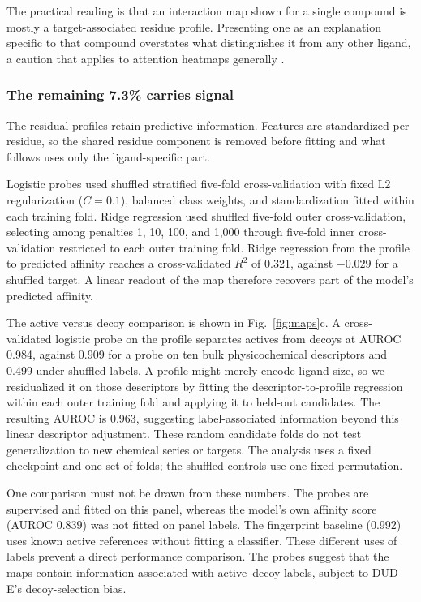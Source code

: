 \documentclass{ieeeaccess}
\begin{document}
The practical reading is that an interaction map shown for a single compound is
mostly a target-associated residue profile. Presenting one as an explanation specific to
that compound overstates what distinguishes it from any other ligand, a caution
that applies to attention heatmaps generally
\cite{jimenezluna2020xai,jain2019attention,wiegreffe2019attention}.

\subsubsection{The remaining 7.3\% carries signal}
The residual profiles retain predictive information. Features are standardized
per residue, so the shared residue component is removed before fitting and
what follows uses only the ligand-specific part.

Logistic probes used shuffled stratified five-fold cross-validation with fixed
L2 regularization ($C = 0.1$), balanced class weights, and standardization fitted
within each training fold. Ridge regression used shuffled five-fold outer
cross-validation, selecting among penalties 1, 10, 100, and 1{,}000 through
five-fold inner cross-validation restricted to each outer training fold.
Ridge regression from the profile to predicted affinity reaches a
cross-validated $R^2$ of 0.321, against $-0.029$ for a shuffled target. A linear
readout of the map therefore recovers part of the model's predicted affinity.

The active versus decoy comparison is shown in Fig.~\ref{fig:maps}c. A
cross-validated logistic probe on the profile separates actives from decoys at
AUROC 0.984, against 0.909 for a probe on ten bulk physicochemical descriptors
and 0.499 under shuffled labels. A profile might merely encode ligand size, so
we residualized it on those descriptors by fitting the descriptor-to-profile
regression within each outer training fold and applying it to held-out candidates.
The resulting AUROC is 0.963, suggesting label-associated information beyond
this linear descriptor adjustment. These random candidate folds do not test
generalization to new chemical series or targets. The analysis uses a fixed
checkpoint and one set of folds; the shuffled controls use one fixed permutation.

One comparison must not be drawn from these numbers. The probes are supervised
and fitted on this panel, whereas the model's own affinity score (AUROC 0.839)
was not fitted on panel labels. The fingerprint baseline (0.992) uses known
active references without fitting a classifier. These different uses of labels
prevent a direct performance comparison. The probes suggest that the maps
contain information associated with active--decoy labels, subject to DUD-E's
decoy-selection bias.
\end{document}
